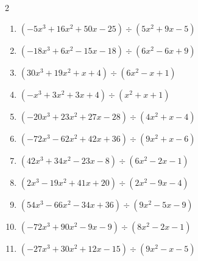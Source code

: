\begin{multicols}{2}
\begin{enumerate}
        \phantom{$商 : -4x+5, \quad 剰余 : -8x+5$}

  \item $(-5x^{3}+16x^{2}+50x-25) \div (5x^{2}+9x-5)$

        \phantom{$商 : -x+5, \quad 剰余 : -9x+2$}

  \item $(-18x^{3}+6x^{2}-15x-18) \div (6x^{2}-6x+9)$

        \phantom{$商 : -3x-2, \quad 剰余 : -4x$}

\columnbreak %

\resetques

  \item $(30x^{3}+19x^{2}+x+4) \div (6x^{2}-x+1)$

        \phantom{$商 : 5x+4, \quad 剰余 : 7x+5$}

  \item $(-x^{3}+3x^{2}+3x+4) \div (x^{2}+x+1)$

        \phantom{$商 : -x+4, \quad 剰余 : -9x$}

  \item $(-20x^{3}+23x^{2}+27x-28) \div (4x^{2}+x-4)$

        \phantom{$商 : -5x+7, \quad 剰余 : -4x-8$}

  \item $(-72x^{3}-62x^{2}+42x+36) \div (9x^{2}+x-6)$

        \phantom{$商 : -8x-6, \quad 剰余 : -3x-1$}

  \item $(42x^{3}+34x^{2}-23x-8) \div (6x^{2}-2x-1)$

        \phantom{$商 : 7x+8, \quad 剰余 : 8x-4$}

\columnbreak %

  \item $(2x^{3}-19x^{2}+41x+20) \div (2x^{2}-9x-4)$

        \phantom{$商 : x-5, \quad 剰余 : x-6$}

  \item $(54x^{3}-66x^{2}-34x+36) \div (9x^{2}-5x-9)$

        \phantom{$商 : 6x-4, \quad 剰余 : -6x$}

  \item $(-72x^{3}+90x^{2}-9x-9) \div (8x^{2}-2x-1)$

        \phantom{$商 : -9x+9, \quad 剰余 : -2x-3$}

  \item $(-27x^{3}+30x^{2}+12x-15) \div (9x^{2}-x-5)$


\end{enumerate}
\end{multicols}
